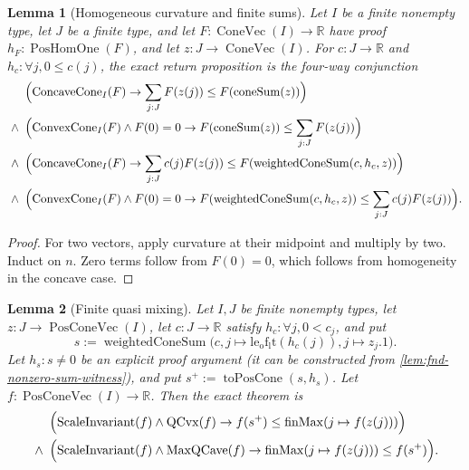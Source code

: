 \documentclass[9pt]{extarticle}
\newtheorem{lemma}{Lemma}[section]
\theoremstyle{definition}
\theoremstyle{remark}
\newcommand{\R}{\mathbb R}
\begin{document}
\begin{lemma}[Homogeneous curvature and finite sums]
\label{lem:fnd-homogeneous-finite-sums}
Let $I$ be a finite nonempty type, let $J$ be a finite type, and let
$F:\operatorname{ConeVec}(I)\to\R$ have proof
$h_F:\operatorname{PosHomOne}(F)$, and let
$z:J\to\operatorname{ConeVec}(I)$.
For $c:J\to\R$ and $h_c:\forall j,0\leq c(j)$, the exact return proposition
is the four-way conjunction
\begin{align*}
 &\Bigl(\operatorname{ConcaveCone}_I(F)\to
   \sum_{j:J}F(z(j))\leq F(\operatorname{coneSum}(z))\Bigr)\\
 {}\wedge{}\;&
 \Bigl(\operatorname{ConvexCone}_I(F)\wedge F(0)=0\to
   F(\operatorname{coneSum}(z))\leq\sum_{j:J}F(z(j))\Bigr)\\
 {}\wedge{}\;&
 \Bigl(\operatorname{ConcaveCone}_I(F)\to
   \sum_{j:J}c(j)F(z(j))
    \leq F(\operatorname{weightedConeSum}(c,h_c,z))\Bigr)\\
 {}\wedge{}\;&
 \Bigl(\operatorname{ConvexCone}_I(F)\wedge F(0)=0\to
   F(\operatorname{weightedConeSum}(c,h_c,z))
    \leq\sum_{j:J}c(j)F(z(j))\Bigr).
\end{align*}
\end{lemma}

\begin{proof}
For two vectors, apply curvature at their midpoint and multiply by two.
Induct on $n$.  Zero terms follow from $F(0)=0$, which follows from
homogeneity in the concave case.
\end{proof}

\begin{lemma}[Finite quasi mixing]
\label{lem:fnd-finite-quasi-mixing}
Let $I,J$ be finite nonempty types, let
$z:J\to\operatorname{PosConeVec}(I)$, let $c:J\to\R$ satisfy
$h_c:\forall j,0<c_j$, and put
\[
 s:=\operatorname{weightedConeSum}
 \bigl(c,j\mapsto\operatorname{le_of_lt}(h_c(j)),j\mapsto z_j.1\bigr).
\]
Let $h_s:s\neq0$ be an explicit proof argument (it can be constructed from
\cref{lem:fnd-nonzero-sum-witness}), and put
$s^+:=\operatorname{toPosCone}(s,h_s)$.  Let
$f:\operatorname{PosConeVec}(I)\to\R$.
Then the exact theorem is
\begin{align*}
 &\Bigl(\operatorname{ScaleInvariant}(f)\wedge\operatorname{QCvx}(f)
   \to f(s^+)\leq\operatorname{finMax}(j\mapsto f(z(j)))\Bigr)\\
 {}\wedge{}\;&
 \Bigl(\operatorname{ScaleInvariant}(f)\wedge\operatorname{MaxQCave}(f)
   \to \operatorname{finMax}(j\mapsto f(z(j)))\leq f(s^+)\Bigr).
\end{align*}
\end{lemma}
\end{document}
